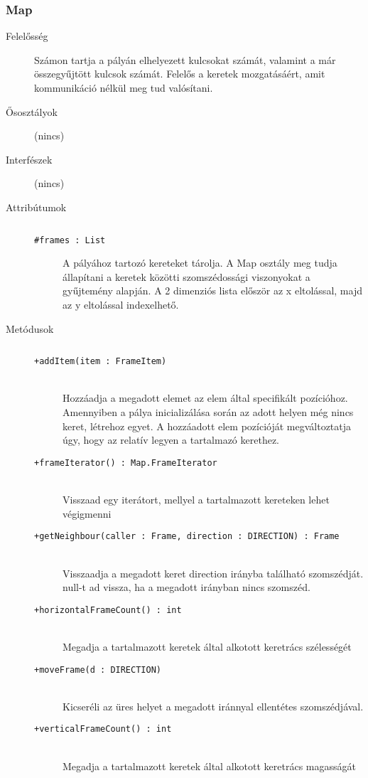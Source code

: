 		\subsubsection{Map}
			\begin{description}

				\item[Felelősség] Számon tartja a pályán elhelyezett kulcsokat számát, valamint a már összegyűjtött kulcsok számát. Felelős a keretek mozgatásáért, amit kommunikáció nélkül meg tud valósítani.

				\item[Ősosztályok] (nincs)
				\item[Interfészek] (nincs)
				\item[Attribútumok]$\ $
					\begin{description}
						\item[\texttt{\#frames : List}]A pályához tartozó kereteket tárolja. A Map osztály  meg tudja állapítani a keretek közötti szomszédossági  viszonyokat a gyűjtemény alapján.    A 2 dimenziós lista először az x eltolással,   majd az y eltolással indexelhető.
					\end{description}
				\item[Metódusok]$\ $
					\begin{description}
						\item[\texttt{+addItem(item : FrameItem)}] \hfill \\Hozzáadja a megadott elemet az elem által specifikált pozícióhoz.  Amennyiben a pálya inicializálása során az adott helyen még nincs keret,  létrehoz egyet.   A hozzáadott elem pozícióját megváltoztatja úgy, hogy az relatív  legyen a tartalmazó kerethez. 
						\item[\texttt{+frameIterator() : Map.FrameIterator}] \hfill \\Visszaad egy iterátort, mellyel a tartalmazott kereteken lehet végigmenni 
						\item[\texttt{+getNeighbour(caller : Frame, direction : DIRECTION) : Frame}] \hfill \\Visszaadja a megadott keret direction irányba található  szomszédját. null-t ad vissza, ha a megadott irányban  nincs szomszéd. 
						\item[\texttt{+horizontalFrameCount() : int}] \hfill \\Megadja a tartalmazott keretek által alkotott keretrács szélességét 
						\item[\texttt{+moveFrame(d : DIRECTION)}] \hfill \\Kicseréli az üres helyet a megadott iránnyal ellentétes  szomszédjával. 
						\item[\texttt{+verticalFrameCount() : int}] \hfill \\Megadja a tartalmazott keretek által alkotott keretrács magasságát 
					\end{description}
			\end{description}

